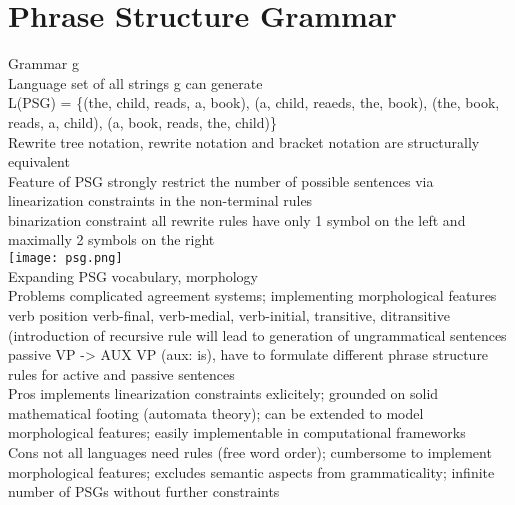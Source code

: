 \section{Phrase Structure Grammar}
\scriptsize{Grammar g} {}\\
\scriptsize{Language} {\tiny set of all strings g can generate\\
L(PSG) = \{(the, child, reads, a, book), (a, child, reaeds, the, book), (the, book, reads, a, child), (a, book, reads, the, child)\}}\\
\scriptsize{Rewrite} {\tiny tree notation, rewrite notation and bracket notation are structurally equivalent}\\
\scriptsize{Feature of PSG} {\tiny strongly restrict the number of possible sentences via linearization constraints in the non-terminal rules}\\
\scriptsize{binarization constraint} {\tiny all rewrite rules have only 1 symbol on the left and maximally 2 symbols on the right}\\
\texttt{[image: psg.png]}\\
\scriptsize{Expanding PSG}
{\tiny vocabulary, morphology}\\
\scriptsize{Problems}
{\tiny complicated agreement systems; implementing morphological features}\\
\scriptsize{verb position}
{\tiny verb-final, verb-medial, verb-initial, transitive, ditransitive (introduction of recursive rule will lead to generation of ungrammatical sentences}\\
\scriptsize{passive}
{\tiny VP -> AUX VP (aux: is), have to formulate different phrase structure rules for active and passive sentences}\\
\scriptsize{Pros}
{\tiny implements linearization constraints exlicitely; grounded on solid mathematical footing (automata theory); can be extended to model morphological features; easily implementable in computational frameworks}\\
\scriptsize{Cons}
{\tiny not all languages need rules (free word order); cumbersome to implement morphological features; excludes semantic aspects from grammaticality; infinite number of PSGs without further constraints}